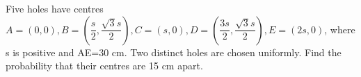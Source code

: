 Five holes have centres $A=(0,0),B=(\dfrac{s}{2},\dfrac{\sqrt{3}s}{2}),C=(s,0),D=(\dfrac{3s}{2},\dfrac{\sqrt{3}s}{2}),E=(2s,0)$, where s is positive and AE=30 cm. Two distinct holes are chosen uniformly. Find the probability that their centres are 15 cm apart.
